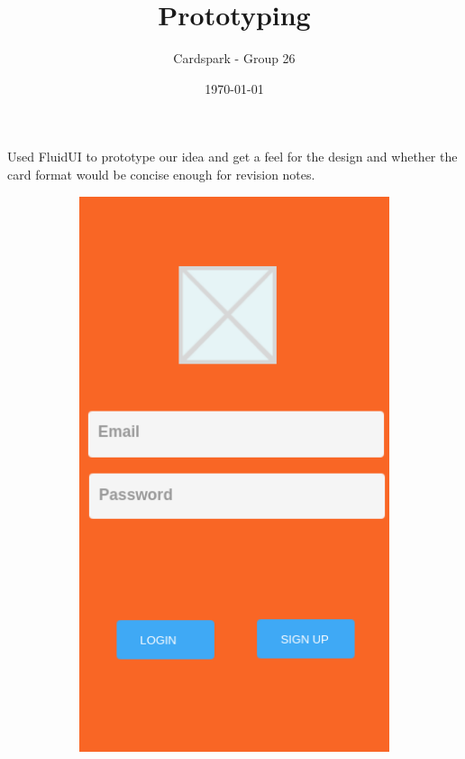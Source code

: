 \documentclass{article}
\begin{document}
\title{Prototyping}
\author{Cardspark - Group 26}
\date{\today}
\maketitle

Used FluidUI to prototype our idea and get a feel for the design and whether the card format would be concise enough for revision notes.
\begin{figure}[ht]
	\centering
	\begin{subfigure}{}
	  \centering
			\includegraphics[scale=0.3]{fluidlogin.png}
	\end{subfigure}%
	\begin{subfigure}{}
	  \centering

\end{subfigure}
\end{figure}
\end{document}
